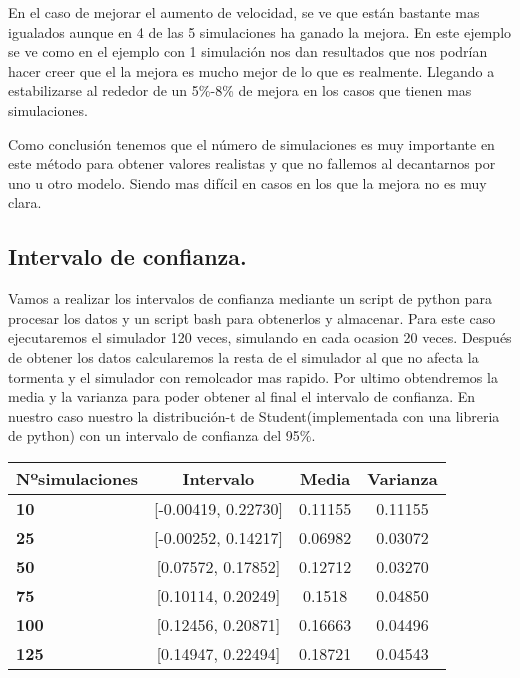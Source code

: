 \documentclass[]{article}
\begin{document}
En el caso de mejorar el aumento de velocidad, se ve que están bastante mas igualados aunque en 4 de las 5 simulaciones ha ganado la mejora. En este ejemplo se ve como en el ejemplo con 1 simulación nos dan resultados que nos podrían hacer creer que el la mejora es mucho mejor de lo que es realmente. Llegando a estabilizarse al rededor de un 5\%-8\% de mejora en los casos que tienen mas simulaciones.

Como conclusión tenemos que el número de simulaciones es muy importante en este método para obtener valores realistas y que no fallemos al decantarnos por uno u otro modelo. Siendo mas difícil en casos en los que la mejora no es muy clara.
\subsection{Intervalo de confianza.}
Vamos a realizar los intervalos de confianza mediante un script de python para procesar los datos y un script bash para obtenerlos y almacenar. 
Para este caso ejecutaremos el simulador 120 veces, simulando en cada ocasion 20 veces. Después de obtener los datos calcularemos la resta de el simulador al que no afecta la tormenta y el simulador con remolcador mas rapido. Por ultimo obtendremos la media y la varianza para poder obtener al final el intervalo de confianza. En nuestro caso nuestro la  distribución-t de Student(implementada con una libreria de python) con un intervalo de confianza del 95\%.
\begin{table}[H]
	\begin{center}
		\begin{tabularx}{1\textwidth}{|X|c|c|c|}
			\hline
			\textbf{Nºsimulaciones} &  \textbf{Intervalo} & \textbf{Media} &\textbf{Varianza} \\
			\hline \hline
			\textbf{10}& [-0.00419, 0.22730] &0.11155 &0.11155\\ \hline
			\textbf{25}&[-0.00252, 0.14217] & 0.06982 &0.03072  \\ \hline
			\textbf{50}&[0.07572, 0.17852] & 0.12712 &  0.03270 \\ \hline
			\textbf{75}& [0.10114, 0.20249]& 0.1518  &0.04850 \\ \hline
			\textbf{100}&[0.12456, 0.20871] & 0.16663 &0.04496\\ \hline
			\textbf{125}&[0.14947, 0.22494] & 0.18721 & 0.04543\\ \hline
			
		\end{tabularx}
		
	\end{center}
\end{table}
\end{document}
